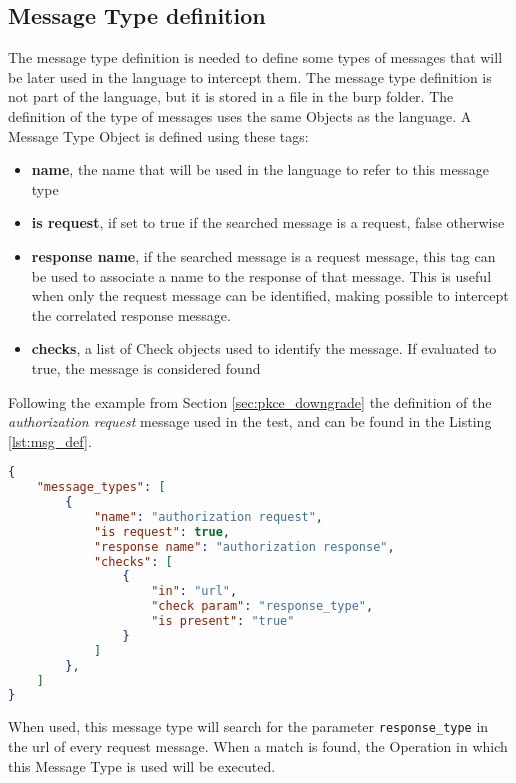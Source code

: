 \subsection{Message Type definition}
The message type definition is needed to define some types of messages that will be later used in the language to intercept them.
The message type definition is not part of the language, but it is stored in a file in the \Gls{burp} folder. The definition of the type of messages uses the same Objects as the language.
A Message Type Object is defined using these tags:
\begin{itemize}
    \item \textbf{name}, the name that will be used in the language to refer to this message type
    \item \textbf{is request}, if set to true if the searched message is a request, false otherwise
    \item \textbf{response name}, if the searched message is a request message, this tag can be used to associate a name to the response of that message. This is useful when only the request message can be identified, making possible to intercept the correlated response message.
    \item \textbf{checks}, a list of Check objects used to identify the message. If evaluated to true, the message is considered found
\end{itemize}

Following the example from Section \ref{sec:pkce_downgrade} the definition of the \textit{authorization request} message used in the test, and can be found in the Listing \ref{lst:msg_def}.

\begin{lstlisting}[language=json, caption=Message Types definition, label={lst:msg_def}]
{
    "message_types": [
        {
            "name": "authorization request",
            "is request": true,
            "response name": "authorization response",
            "checks": [
                {
                    "in": "url",
                    "check param": "response_type",
                    "is present": "true"
                }
            ]
        },
    ]
}
\end{lstlisting}

When used, this message type will search for the parameter \texttt{response\_type} in the url of every request message. When a match is found, the Operation in which this Message Type is used will be executed.

